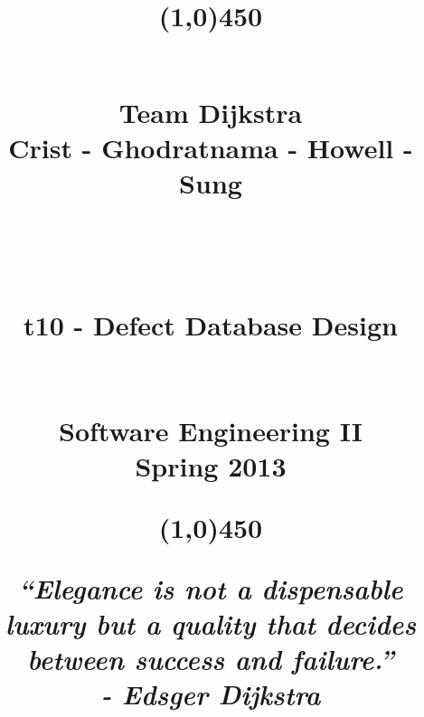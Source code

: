 \documentclass[11pt, letterpaper]{report}
\begin{document}
\title{\begin{center}
\line(1,0){450}
\end{center} \hfill \\ \Huge{Team Dijkstra }\\ \small{Crist - Ghodratnama - Howell - Sung} \\ \hfill \\ \hfill \\ \hfill \\ \huge{t10 - Defect Database Design} \\ \hfill \\ \hfill  \\ \Large{Software Engineering II} \\ \small{Spring 2013} \\ \begin{center}
\line(1,0){450}
\end{center}\small{\textit{``Elegance is not a dispensable luxury but a quality that decides between success and failure.'' \\- Edsger Dijkstra}}}
\date{ }

\maketitle
\newpage
\end{document}
